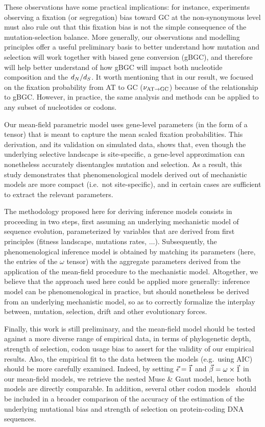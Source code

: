 These observations have some practical implications: for instance, experiments observing a fixation (or segregation) bias toward GC at the \gls{non-synonymous} level must also rule out that this fixation bias is not the simple consequence of the mutation-selection balance.
More generally, our observations and modelling principles offer a useful preliminary basis to better understand how mutation and selection will work together with biased gene conversion (\acrshort{gBGC}), and therefore will help better understand of how \acrshort{gBGC} will impact both nucleotide composition and the $d_N / d_S$.
It worth mentioning that in our result, we focused on the fixation probability from AT to GC ($\nu_{\text{AT} \rightarrow \text{GC}}$) because of the relationship to \acrshort{gBGC}.
However, in practice, the same analysis and methods can be applied to any subset of nucleotides or \glspl{codon}.

Our mean-field parametric model uses gene-level parameters (in the form of a tensor) that is meant to capture the mean scaled fixation probabilities.
This derivation, and its validation on simulated data, shows that, even though the underlying selective landscape is site-specific, a gene-level approximation can nonetheless accurately disentangles mutation and selection.
As a result, this study demonstrates that phenomenological models derived out of mechanistic models are more compact (i.e.~not site-specific), and in certain cases are sufficient to extract the relevant parameters.

The methodology proposed here for deriving inference models consists in proceeding in two steps, first assuming an underlying mechanistic model of sequence evolution, parameterized by variables that are derived from first principles (fitness landscape, mutations rates, $\hdots$).
Subsequently, the phenomenological inference model is obtained by matching its parameters (here, the entries of the $\omega$ tensor) with the aggregate parameters derived from the application of the mean-field procedure to the mechanistic model.
Altogether, we believe that the approach used here could be applied more generally: inference model can be phenomenological in practice, but should nonetheless be derived from an underlying mechanistic model, so as to correctly formalize the interplay between, mutation, selection, drift and other evolutionary forces.

Finally, this work is still preliminary, and the mean-field model should be tested against a more diverse range of empirical data, in terms of phylogenetic depth, strength of selection, \gls{codon usage bias} to assert for the validity of our empirical results.
Also, the empirical fit to the data between the models (e.g.~using AIC) should be more carefully examined.
Indeed, by setting $\vec{\epsilon} = \vec{1}$ and $\vec{\beta} = \omega \times \vec{1}$ in our mean-field models, we retrieve the nested Muse \& Gaut model, hence both models are directly comparable.
In addition, several other \gls{codon} models~\citep{Rodrigue2008a,KosakovskyPond2020} should be included in a broader comparison of the accuracy of the estimation of the underlying mutational bias and strength of selection on protein-coding \acrshort{DNA} sequences.


